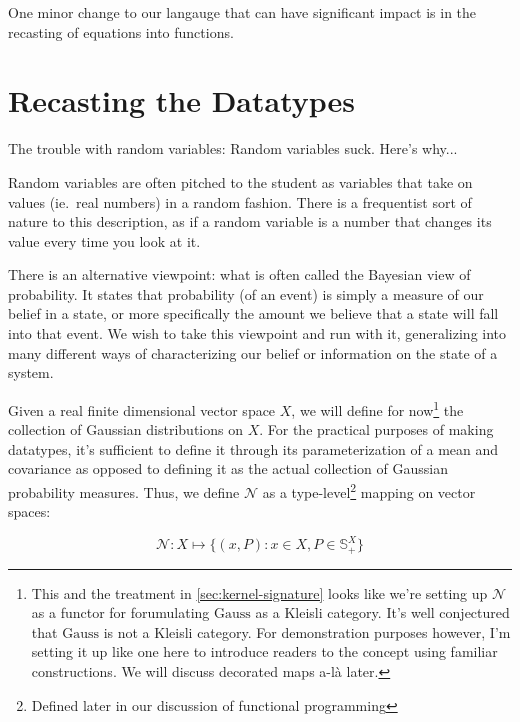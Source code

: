 
One minor change to our langauge that can have significant impact is in the recasting of equations into functions.

\section{Recasting the Datatypes}
The trouble with random variables:
Random variables suck. Here's why...

Random variables are often pitched to the student as variables that take on values (ie.\ real numbers) in a random fashion.
There is a frequentist sort of nature to this description, as if a random variable is a number that changes its value every time you look at it.

There is an alternative viewpoint: what is often called the Bayesian view of probability.
It states that probability (of an event) is simply a measure of our belief in a state, or more specifically the amount we believe that a state will fall into that event.
We wish to take this viewpoint and run with it, generalizing into many different ways of characterizing our belief or information on the state of a system.

\newcommand{\gaussian}{\mathcal{N}}
\newcommand{\gausscat}{\mathrm{Gauss}}
Given a real finite dimensional vector space $X$, we will define for now\footnote{This and the treatment in \ref{sec:kernel-signature} looks like we're setting up $\gaussian$ as a functor for forumulating $\gausscat$ as a Kleisli category. It's well conjectured that $\gausscat$ is not a Kleisli category. For demonstration purposes however, I'm setting it up like one here to introduce readers to the concept using familiar constructions. We will discuss decorated maps a-l\`a \cite{stein2022extended} later.} the collection of Gaussian distributions on $X$.
For the practical purposes of making datatypes, it's sufficient to define it through its parameterization of a mean and covariance as opposed to defining it as the actual collection of Gaussian probability measures.
Thus, we define $\gaussian$ as a type-level\footnote{Defined later in our discussion of functional programming} mapping on vector spaces:

\newcommand{\symmetric}{\mathds{S}}
\begin{equation}
    \gaussian : X \mapsto \{(x,P) : x\in X, P \in \symmetric^X_+\}
\end{equation}

